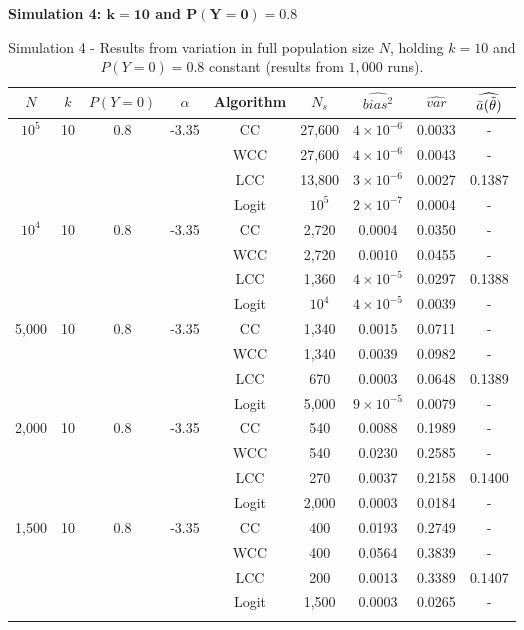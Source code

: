\textbf{Simulation 4: $\mathbf{k=10}$ and $\mathbf{P(Y=0)=0.8}$}\\

\begin{longtable}{ccccccccc}
\toprule
$N$ & $k$ & $P(Y=0)$ & $\alpha$ & Algorithm & $N_s$ & $\widehat{bias^2}$ & $\widehat{var}$ & $\widehat{\Bar{a}(\Tilde{\theta})}$\\
\midrule
$10^5$ & 10 & 0.8 & -3.35 & CC & 27,600 & $4\times10^{-6}$ & 0.0033 & - \\
 & & & & WCC & 27,600 & $4\times10^{-6}$ & 0.0043 & - \\
 & & & & LCC & 13,800 & $3\times10^{-6}$ & 0.0027 & 0.1387\\
 & & & & Logit & $10^5$ & $2\times10^{-7}$ & 0.0004 & -\\
 \midrule
$10^4$ & 10 & 0.8 & -3.35 & CC & 2,720 & 0.0004 & 0.0350 & - \\
 & & & & WCC & 2,720 &  0.0010 & 0.0455 & - \\
 & & & & LCC & 1,360 & $4\times10^{-5}$ & 0.0297 & 0.1388 \\
 & & & & Logit & $10^4$ & $4\times10^{-5}$ & 0.0039 & - \\
\midrule
5,000 & 10 & 0.8 & -3.35 & CC & 1,340 & 0.0015 & 0.0711 & - \\
 & & & & WCC & 1,340 & 0.0039 & 0.0982 & - \\
 & & & & LCC & 670 & 0.0003 & 0.0648 & 0.1389 \\
 & & & & Logit & 5,000 & $9\times10^{-5}$ & 0.0079 & - \\
 \midrule
2,000 & 10 & 0.8 & -3.35 & CC & 540 & 0.0088 & 0.1989 & - \\
 & & & & WCC & 540 & 0.0230 & 0.2585 & - \\
 & & & & LCC & 270 & 0.0037 & 0.2158 & 0.1400 \\
 & & & & Logit & 2,000 & 0.0003 & 0.0184 & - \\
 \midrule
1,500 & 10 & 0.8 & -3.35 & CC & 400 & 0.0193 & 0.2749 & - \\
 & & & & WCC & 400 & 0.0564 & 0.3839 & -\\
 & & & & LCC & 200 & 0.0013 & 0.3389 & 0.1407 \\
 & & & & Logit & 1,500 & 0.0003 & 0.0265 & - \\
\bottomrule
\caption[Simulation 4 - Results from variation in full population size $N$, holding $k=10$ and $P(Y=0)=0.8$ constant]{Simulation 4 - Results from variation in full population size $N$, holding $k=10$ and $P(Y=0)=0.8$ constant (results from $1,000$ runs).}
\label{tab:sim4-0.8}
\end{longtable}

